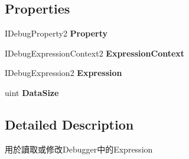 \subsection*{Properties}
\begin{DoxyCompactItemize}
\item 
\hypertarget{classlib_wather_debugger_1_1_property_1_1_debug_property_a484b62710c4fe8ff56a9d652c3003bc2}{I\+Debug\+Property2 {\bfseries Property}}\label{classlib_wather_debugger_1_1_property_1_1_debug_property_a484b62710c4fe8ff56a9d652c3003bc2}

\item 
\hypertarget{classlib_wather_debugger_1_1_property_1_1_debug_property_a5ecd6cebf617fe46c2588f56323d0c1e}{I\+Debug\+Expression\+Context2 {\bfseries Expression\+Context}}\label{classlib_wather_debugger_1_1_property_1_1_debug_property_a5ecd6cebf617fe46c2588f56323d0c1e}

\item 
\hypertarget{classlib_wather_debugger_1_1_property_1_1_debug_property_adb20e36c44f95d157c3639cc27a03dab}{I\+Debug\+Expression2 {\bfseries Expression}}\label{classlib_wather_debugger_1_1_property_1_1_debug_property_adb20e36c44f95d157c3639cc27a03dab}

\item 
\hypertarget{classlib_wather_debugger_1_1_property_1_1_debug_property_a3dbfbdb350644d1a2c34f5c04aaba598}{uint {\bfseries Data\+Size}}\label{classlib_wather_debugger_1_1_property_1_1_debug_property_a3dbfbdb350644d1a2c34f5c04aaba598}

\end{DoxyCompactItemize}


\subsection{Detailed Description}
用於讀取或修改\+Debugger中的\+Expression 



